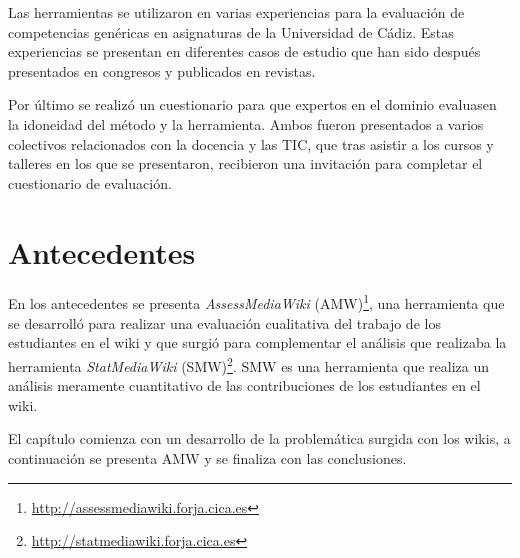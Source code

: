 



Las herramientas se utilizaron en varias experiencias para la evaluación de competencias genéricas en asignaturas de la Universidad de Cádiz. Estas experiencias se presentan en diferentes casos de estudio que han sido después presentados en congresos y publicados en revistas.

Por último se realizó un cuestionario para que expertos en el dominio evaluasen la idoneidad del método y la herramienta. Ambos fueron presentados a varios colectivos relacionados con la docencia y las TIC, que tras asistir a los cursos y talleres en los que se presentaron, recibieron una invitación para completar el cuestionario de evaluación.


\section{Antecedentes} \label{subcha:antecedentes}

En los antecedentes se presenta \emph{AssessMediaWiki} (AMW)\footnote{\url{http://assessmediawiki.forja.cica.es}}, una herramienta que se desarrolló para realizar una evaluación cualitativa del trabajo de los estudiantes en el wiki y que surgió para complementar el análisis que realizaba la herramienta \emph{StatMediaWiki} (SMW)\footnote{\url{http://statmediawiki.forja.cica.es}}. SMW es una herramienta que realiza un análisis meramente cuantitativo de las contribuciones de los estudiantes en el wiki.

El capítulo comienza con un desarrollo de la problemática surgida con los wikis, a continuación se presenta AMW y se finaliza con las conclusiones.


